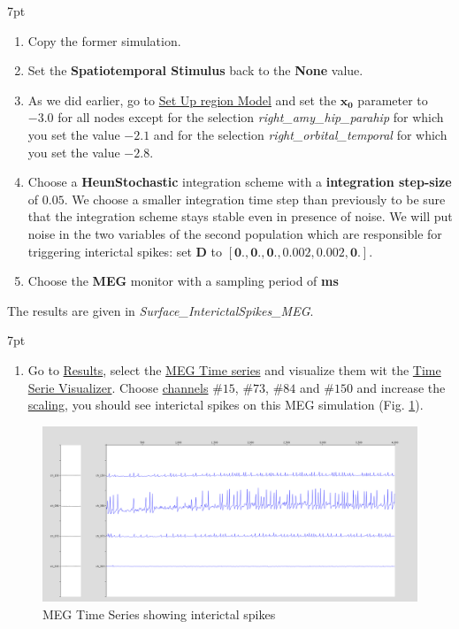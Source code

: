 \documentclass{tufte-handout}
\newenvironment{simulation}{%
  \def\FrameCommand{%
    \hspace{1pt}%
    {\color{ForestGreen}\vrule width 2pt}%
    {\color{simulationshade}\vrule width 4pt}%
    \colorbox{simulationshade}%
  }%
  \MakeFramed{\advance\hsize-\width\FrameRestore}%
  \noindent\hspace{-4.55pt}%
  \begin{adjustwidth}{}{7pt}%
  \vspace{2pt}\vspace{2pt}%
}
{%
  \vspace{2pt}\end{adjustwidth}\endMakeFramed%
}
\begin{document}
  \begin{simulation}
  \begin{enumerate}
  \item Copy the former simulation.
  \item Set the \textbf{Spatiotemporal Stimulus} back to the \textbf{None} value.
  \item As we did earlier, go to \underline{Set Up region Model} and set the $\mathbf{x_0}$ parameter to $\mathbf{-3.0}$ for all 
  nodes except for the selection \textit{right\_amy\_hip\_parahip} for which you set the value $\mathbf{-2.1}$ and for the selection
  \textit{right\_orbital\_temporal} for which you set the value $\mathbf{-2.8}$.
  \item Choose a \textbf{HeunStochastic} integration scheme with a \textbf{integration step-size} of $\mathbf{0.05}$. We choose
  a smaller integration time step than previously to be sure that  the integration scheme stays stable even in presence of noise.
  We will put noise in the two variables of the second population which are responsible for triggering interictal spikes:
  set $\mathbf{D}$ to $\mathbf{[0., 0., 0., 0.002, 0.002, 0.]}$.
  \item Choose the \textbf{MEG} monitor with a sampling period of \textbf{\unit[1]{ms}}
\end{enumerate}
\end{simulation}

The results are given in \textit{Surface\_InterictalSpikes\_MEG}.

  \begin{simulation}
  \begin{enumerate}
  \item Go to \underline{Results}, select the \underline{MEG Time series} and visualize them wit the \underline{Time Serie Visualizer}.
  Choose \underline{channels} $\#15$, $\#73$, $\#84$ and $\#150$ and increase the \underline{scaling}, you should see interictal spikes on this MEG simulation 
  (Fig. \ref{fig:ts_meg}).
\end{enumerate}
\end{simulation}

\begin{figure}[h]
  \includegraphics[width=\linewidth]{Handout_UI_ModellingAnEpilepticPatient_MEGTimeSeries}%
  \caption{MEG Time Series showing interictal spikes}%
  \label{fig:ts_meg}%
\end{figure}
\end{document}

